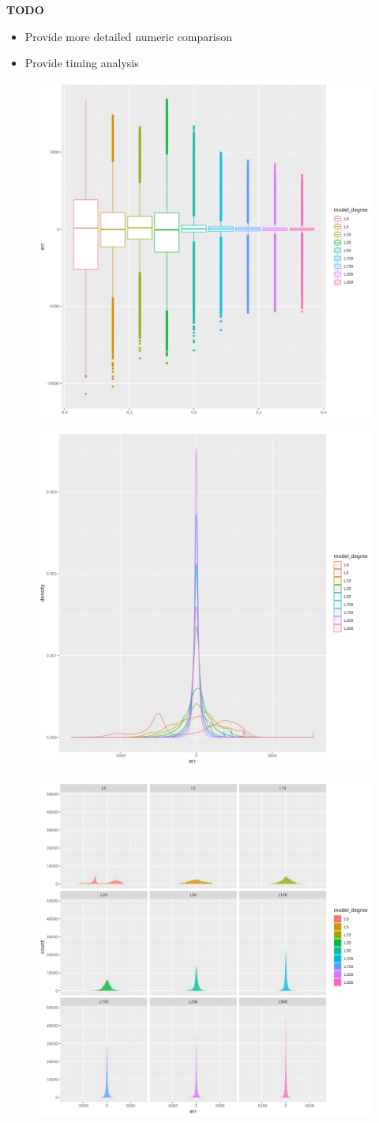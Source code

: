\documentclass[a4paper]{article}
\theoremstyle{definition}
\begin{document}
\textbf{TODO}
\begin{itemize}
    \item Provide more detailed numeric comparison
    \item Provide timing analysis
\end{itemize}

\begin{figure}
    \centering
    \includegraphics[width=0.5\linewidth]{media/boxplot_hi.png}
\end{figure}

\begin{figure}
    \centering
    \includegraphics[width=0.5\linewidth]{media/density_small.png}
\end{figure}

\begin{figure}
    \centering
    \includegraphics[width=0.5\linewidth]{media/faceted_histogram_med.png}

\end{figure}
\end{document}
